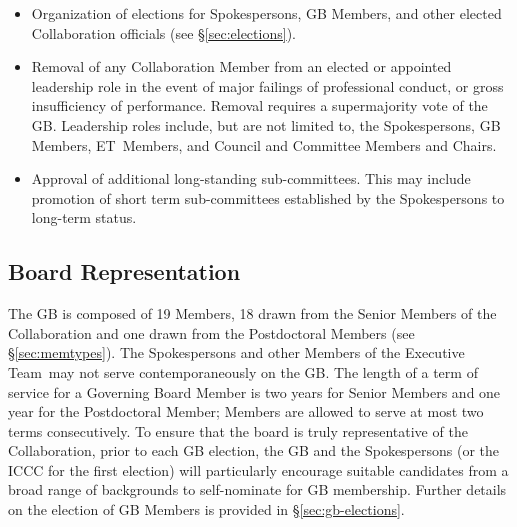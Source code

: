 \documentclass[12pt]{article}
\newcommand{\exec}{{Executive Team}}
\newcommand{\shorte}{{ET}}  %
\begin{document}
\begin{itemize}
\item Organization of elections for Spokespersons, GB Members, and other elected Collaboration officials (see \S\ref{sec:elections}).  

\item Removal of any Collaboration Member from an elected or appointed leadership role in the event of major failings of professional conduct, or gross insufficiency of performance.  Removal requires a supermajority vote of the GB.   Leadership roles include, but are not limited to, the Spokespersons, GB Members, \shorte\ Members, and Council and Committee Members and Chairs.  %


\item Approval of additional long-standing sub-committees.%
This may include promotion of short term sub-committees established by the Spokespersons to long-term status. 


\end{itemize}


\subsection{Board Representation}
The GB is composed of 19 Members, 18 drawn from the Senior Members of the Collaboration and one drawn from the Postdoctoral Members (see \S\ref{sec:memtypes}). The Spokespersons and other Members of the \exec\ may not serve contemporaneously on the GB.  
The length of a term of service for a Governing Board Member is two years for Senior Members and one year for the Postdoctoral Member; Members are allowed to serve at most two terms consecutively.
To ensure that the board is truly representative of the Collaboration, prior to each GB election,  the GB and the Spokespersons (or the ICCC for the first election) will particularly encourage suitable candidates from a broad range of 
backgrounds to self-nominate  for GB membership.  Further details on the election of GB Members is provided in  \S\ref{sec:gb-elections}.  
\end{document}
